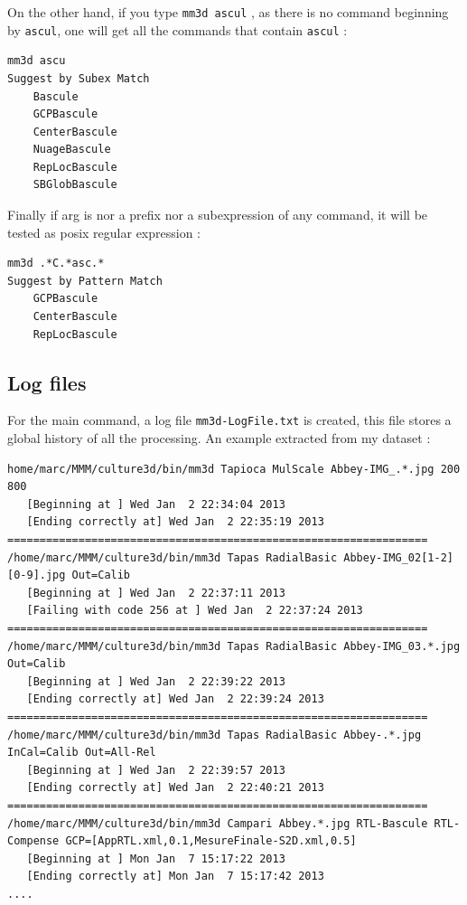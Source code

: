 On the other hand, if you type {\tt mm3d ascul} , as there is no command beginning by {\tt ascul},
one will get all the commands that contain {\tt ascul} :


\begin{verbatim}
mm3d ascu
Suggest by Subex Match
    Bascule
    GCPBascule
    CenterBascule
    NuageBascule
    RepLocBascule
    SBGlobBascule
\end{verbatim}


Finally if arg is nor a prefix nor a subexpression of any command, it will be tested as posix regular 
expression :

\begin{verbatim}
mm3d .*C.*asc.*
Suggest by Pattern Match
    GCPBascule
    CenterBascule
    RepLocBascule
\end{verbatim}

\subsection{Log files}

For the main command, a log file {\tt mm3d-LogFile.txt} is created, this file stores
a global history of all the processing. An example extracted from my dataset :

\begin{verbatim}
home/marc/MMM/culture3d/bin/mm3d Tapioca MulScale Abbey-IMG_.*.jpg 200 800
   [Beginning at ] Wed Jan  2 22:34:04 2013
   [Ending correctly at] Wed Jan  2 22:35:19 2013
=================================================================
/home/marc/MMM/culture3d/bin/mm3d Tapas RadialBasic Abbey-IMG_02[1-2][0-9].jpg Out=Calib
   [Beginning at ] Wed Jan  2 22:37:11 2013
   [Failing with code 256 at ] Wed Jan  2 22:37:24 2013
=================================================================
/home/marc/MMM/culture3d/bin/mm3d Tapas RadialBasic Abbey-IMG_03.*.jpg Out=Calib
   [Beginning at ] Wed Jan  2 22:39:22 2013
   [Ending correctly at] Wed Jan  2 22:39:24 2013
=================================================================
/home/marc/MMM/culture3d/bin/mm3d Tapas RadialBasic Abbey-.*.jpg InCal=Calib Out=All-Rel
   [Beginning at ] Wed Jan  2 22:39:57 2013
   [Ending correctly at] Wed Jan  2 22:40:21 2013
=================================================================
/home/marc/MMM/culture3d/bin/mm3d Campari Abbey.*.jpg RTL-Bascule RTL-Compense GCP=[AppRTL.xml,0.1,MesureFinale-S2D.xml,0.5]
   [Beginning at ] Mon Jan  7 15:17:22 2013
   [Ending correctly at] Mon Jan  7 15:17:42 2013
....
\end{verbatim}

